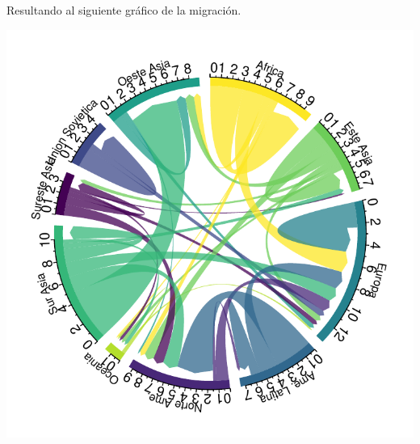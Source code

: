 \documentclass{article}\usepackage[]{graphicx}\usepackage[]{color}
\makeatletter
\def\maxwidth{ %
  \ifdim\Gin@nat@width>\linewidth
    \linewidth
  \else
    \Gin@nat@width
  \fi
}
\newenvironment{knitrout}{}{} %
\makeatother
\begin{document}
Resultando al siguiente gr\'afico de la migraci\'on.
\begin{knitrout}
\color{fgcolor}

{\centering \includegraphics[width=\maxwidth]{figure/plot-1} 

}



\end{knitrout}
\end{document}
